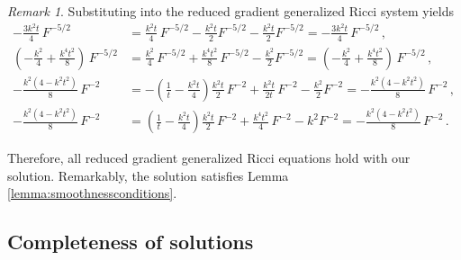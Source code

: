 \documentclass[12pt,a4paper,reqno]{amsart}
\theoremstyle{plain}
\theoremstyle{remark}
\newtheorem{remark}[theorem]{Remark}
\numberwithin{equation}{section}
\begin{document}
\begin{remark}
Substituting into the reduced gradient generalized Ricci system yields
\begin{align*}
- \frac{3k^2t}{4}\,F^{-5/2} %
&= \frac{k^2t}{4}\, F^{-5/2} - \frac{k^2t}{2} F^{-5/2} - \frac{k^2 t}{2}F^{-5/2} = - \frac{3k^2t}{4}\,F^{-5/2} \,, \\
\left(-\frac{k^2}{4}+\frac{k^4t^2}{8}\right) \,F^{-5/2} %
&= \frac{k^2}{4}\,F^{-5/2} + \frac{k^4t^2}{8}\,F^{-5/2} - \frac{k^2}{2} F^{-5/2} = \left(-\frac{k^2}{4}+\frac{k^4t^2}{8}\right) \,F^{-5/2} \,, \\
- \frac{k^2(4-k^2t^2)}{8} \,F^{-2} %
&= - \left(\frac{1}{t} - \frac{k^2t}{4}\right) \frac{k^2t}{2} \,F^{-2} + \frac{k^2t}{2t} \,F^{-2} - \frac{k^2}{2} F^{-2} = - \frac{k^2(4-k^2t^2)}{8} \,F^{-2} \,, \\
- \frac{k^2(4-k^2t^2)}{8} \,F^{-2} %
&= \left( \frac{1}{t} - \frac{k^2t}{4} \right) \frac{k^2t}{2} \,F^{-2} + \frac{k^4t^2}{4} \,F^{-2} - k^2 F^{-2} = - \frac{k^2(4-k^2t^2)}{8} \,F^{-2} \,.
\end{align*}

Therefore, all reduced gradient generalized Ricci equations hold with our solution. Remarkably, the solution satisfies Lemma \ref{lemma:smoothnessconditions}.
\end{remark}


\subsection{Completeness of solutions}
\end{document}
